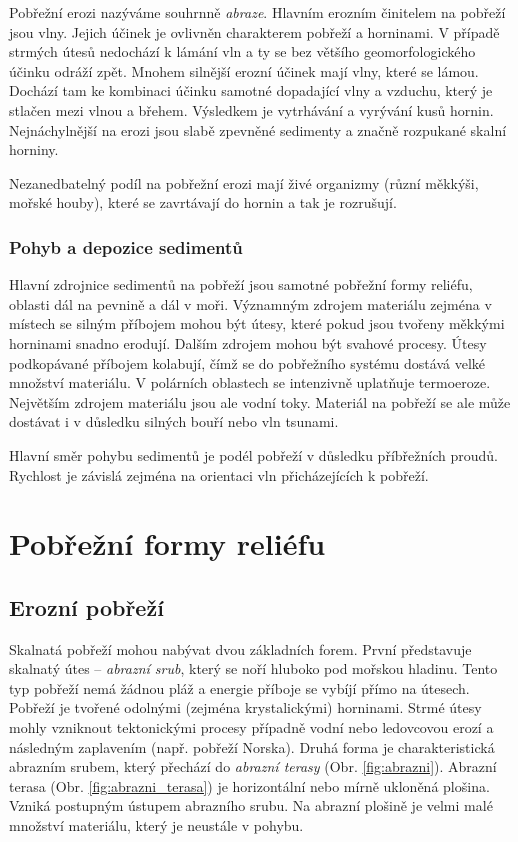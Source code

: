 Pobřežní erozi nazýváme souhrnně \emph{abraze}. Hlavním erozním činitelem na pobřeží jsou vlny. Jejich účinek je ovlivněn charakterem pobřeží a horninami. V případě strmých útesů nedochází k lámání vln a ty se bez většího geomorfologického účinku odráží zpět. Mnohem silnější erozní účinek mají vlny, které se lámou. Dochází tam ke kombinaci účinku samotné dopadající vlny a vzduchu, který je stlačen mezi vlnou a břehem. Výsledkem je vytrhávání a vyrývání kusů hornin. Nejnáchylnější na erozi jsou slabě zpevněné sedimenty a značně rozpukané skalní horniny.

Nezanedbatelný podíl na pobřežní erozi mají živé organizmy (různí měkkýši, mořské houby), které se zavrtávají do hornin a tak je rozrušují. 

\subsubsection{Pohyb a depozice sedimentů}
Hlavní zdrojnice sedimentů na pobřeží jsou samotné pobřežní formy reliéfu, oblasti dál na pevnině a dál v moři. Významným zdrojem materiálu zejména v místech se silným příbojem mohou být útesy, které pokud jsou tvořeny měkkými horninami snadno erodují. Dalším zdrojem mohou být svahové procesy. Útesy podkopávané příbojem kolabují, čímž se do pobřežního systému dostává velké množství materiálu. V polárních oblastech se intenzivně uplatňuje termoeroze. Největším zdrojem materiálu jsou ale vodní toky.  Materiál na pobřeží se ale může dostávat i v důsledku silných bouří nebo vln tsunami.

Hlavní směr pohybu sedimentů je podél pobřeží v důsledku příbřežních proudů. Rychlost je závislá zejména na orientaci vln přicházejících k pobřeží.

\section{Pobřežní formy reliéfu}

\subsection{Erozní pobřeží}
Skalnatá pobřeží mohou nabývat dvou základních forem. První představuje skalnatý útes -- \emph{abrazní srub}, který se noří hluboko pod mořskou hladinu. Tento typ pobřeží nemá žádnou pláž a energie příboje se vybíjí přímo na útesech. Pobřeží je tvořené odolnými (zejména krystalickými) horninami. Strmé útesy mohly vzniknout tektonickými procesy případně vodní nebo ledovcovou erozí a následným zaplavením (např. pobřeží Norska). Druhá forma je charakteristická abrazním srubem, který přechází do \emph{abrazní terasy} (Obr. \ref{fig:abrazni}). Abrazní terasa (Obr. \ref{fig:abrazni_terasa}) je horizontální nebo mírně ukloněná plošina. Vzniká postupným ústupem abrazního srubu. Na abrazní plošině je velmi malé množství materiálu, který je neustále v pohybu.

